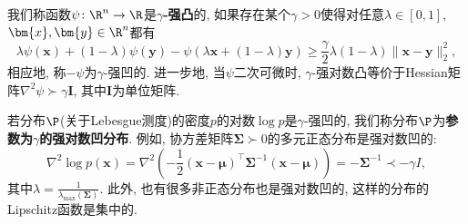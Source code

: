 我们称函数$\psi \colon \R^n \to \R$是\textbf{$\gamma$-强凸}的, 如果存在某个$\gamma > 0$使得对任意$\lambda \in [0,1]$, $\bm{x}, \bm{y} \in \R^n$都有
\begin{equation*}
	\lambda \psi(\bm{x}) + (1-\lambda) \psi(\bm{y}) - \psi(\lambda \bm{x} + (1-\lambda) \bm{y})
	\geq \frac{\gamma}{2} \lambda (1-\lambda) \|\bm{x} - \bm{y}\|_2^2, 
\end{equation*}
相应地, 称$-\psi$为$\gamma$-强凹的. 
进一步地, 当$\psi$二次可微时, $\gamma$-强对数凸等价于Hessian矩阵$\nabla^2 \psi \succ \gamma \bm{I}$, 其中$\bm{I}$为单位矩阵. 

若分布$\P$(关于Lebesgue测度)的密度$p$的对数$\log p$是$\gamma$-强凹的, 我们称分布$\P$为\textbf{参数为$\gamma$的强对数凹分布}. 
例如, 协方差矩阵$\bm{\Sigma} \succ 0$的多元正态分布是强对数凹的: 
\begin{equation*}
	\nabla^2 \log p(\bm{x})
	= \nabla^2 \left( -\frac{1}{2} (\bm{x} - \bm{\mu})^{\top} \bm{\Sigma}^{-1} (\bm{x} - \bm{\mu})  \right)
	= - \bm{\Sigma}^{-1} 
	\prec - \gamma I, 
\end{equation*}
其中$\lambda = \frac{1}{\lambda_{\max}(\bm{\Sigma})}$. 
此外, 也有很多非正态分布也是强对数凹的, 这样的分布的Lipschitz函数是集中的. 

